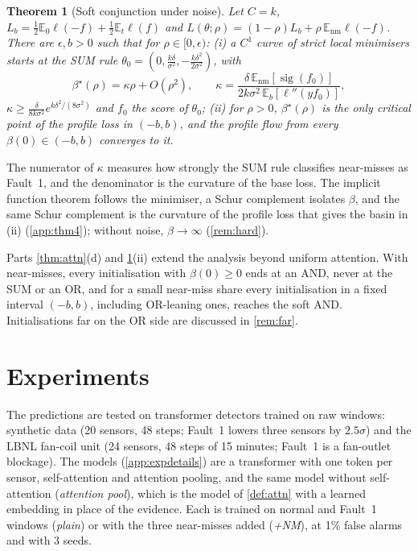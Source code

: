 \documentclass{article}
\theoremstyle{plain}
\newtheorem{theorem}{Theorem}
\theoremstyle{definition}
\theoremstyle{remark}
\newcommand{\E}{\mathbb{E}}
\newcommand{\sig}{\operatorname{sig}}
\newcommand{\nm}{\mathrm{nm}}
\begin{document}
\begin{theorem}[Soft conjunction under noise]\label{thm:soft}
Let $C=k$, $L_b=\frac12\E_0\ell(-f)+\frac12\E_t\ell(f)$ and $L(\theta;\rho)=(1-\rho)L_b+\rho\,\E_\nm\ell(-f)$. There are $\epsilon,b>0$ such that for $\rho\in[0,\epsilon)$: (i) a $C^1$ curve of strict local minimisers starts at the SUM rule $\theta_0=(0,\frac{k\delta}{\sigma^2},-\frac{k\delta^2}{2\sigma^2})$, with
\[
  \beta^\star(\rho)=\kappa\rho+O(\rho^2),\qquad
  \kappa=\frac{\delta\,\E_\nm[\sig(f_0)]}{2k\sigma^2\,\E_b[\ell''(yf_0)]},
\]
$\kappa\ge\frac{\delta}{8k\sigma^2}e^{k\delta^2/(8\sigma^2)}$ and $f_0$ the score of $\theta_0$; (ii) for $\rho>0$, $\beta^\star(\rho)$ is the only critical point of the profile loss in $(-b,b)$, and the profile flow from every $\beta(0)\in(-b,b)$ converges to it.
\end{theorem}

The numerator of $\kappa$ measures how strongly the SUM rule classifies near-misses as Fault~1, and the denominator is the curvature of the base loss. The implicit function theorem follows the minimiser, a Schur complement isolates $\beta$, and the same Schur complement is the curvature of the profile loss that gives the basin in (ii) (\cref{app:thm4}); without noise, $\beta\to\infty$ (\cref{rem:hard}).

Parts \ref{thm:attn}(d) and \ref{thm:soft}(ii) extend the analysis beyond uniform attention. With near-misses, every initialisation with $\beta(0)\ge0$ ends at an AND, never at the SUM or an OR, and for a small near-miss share every initialisation in a fixed interval $(-b,b)$, including OR-leaning ones, reaches the soft AND. Initialisations far on the OR side are discussed in \cref{rem:far}.

\section{Experiments}\label{sec:exp}

The predictions are tested on transformer detectors trained on raw windows: synthetic data (20 sensors, 48 steps; Fault~1 lowers three sensors by $2.5\sigma$) and the LBNL fan-coil unit \citep{granderson2023} (24 sensors, 48 steps of 15 minutes; Fault~1 is a fan-outlet blockage). The models (\cref{app:expdetails}) are a transformer with one token per sensor, self-attention \citep{vaswani2017} and attention pooling, and the same model without self-attention (\emph{attention pool}), which is the model of \cref{def:attn} with a learned embedding in place of the evidence. Each is trained on normal and Fault~1 windows (\emph{plain}) or with the three near-misses added (\emph{+NM}), at 1\% false alarms and with 3 seeds.
\end{document}
